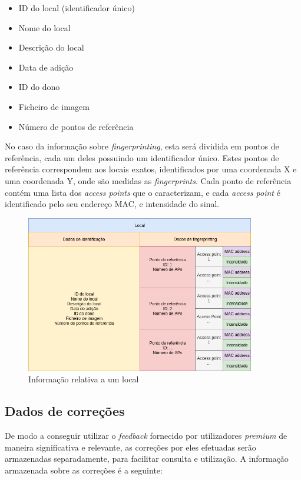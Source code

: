\documentclass[12pt]{article} %
\begin{document}
\begin{itemize}[noitemsep]
\item ID do local (identificador único)
\item Nome do local
\item Descrição do local
\item Data de adição
\item ID do dono
\item Ficheiro de imagem
\item Número de pontos de referência
\end{itemize}

No caso da informação sobre \textit{fingerprinting}, esta será dividida em pontos de referência, cada um deles possuindo um identificador único. Estes pontos de referência correspondem aos locais exatos, identificados por uma coordenada X e uma coordenada Y, onde são medidas as \textit{fingerprints}. Cada ponto de referência contém uma lista dos \textit{access points} que o caracterizam, e cada \textit{access point} é identificado pelo seu endereço MAC, e intensidade do sinal.

\begin{figure}[!htbp]
  \centering
    \includegraphics[width=10cm]{modelodadoslocal.png}
  \caption{Informação relativa a um local}
\end{figure}

\pagebreak

\subsection{Dados de correções}
De modo a conseguir utilizar o \textit{feedback} fornecido por utilizadores \textit{premium} de maneira significativa e relevante, as correções por eles efetuadas serão armazenadas separadamente, para facilitar consulta e utilização. A informação armazenada sobre as correções é a seguinte:
\end{document}
